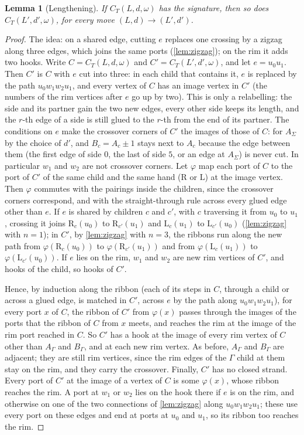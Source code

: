 \documentclass[11pt]{amsart}
\newtheorem{lemma}[theorem]{Lemma}
\theoremstyle{definition}
\theoremstyle{remark}
\newcommand{\Lp}{\mathrm L}
\newcommand{\Rp}{\mathrm R}
\begin{document}
\begin{lemma}[Lengthening]\label{lem:lengthen}
If $C_T(L,d,\omega)$ has the signature, then so does $C_T(L',d',\omega)$, for every move $(L,d)\to(L',d')$.
\end{lemma}

\begin{proof}
The idea: on a shared edge, cutting $e$ replaces one crossing by a zigzag along three edges, which joins the same
ports (\cref{lem:zigzag}); on the rim it adds two hooks. Write $C=C_T(L,d,\omega)$ and $C'=C_T(L',d',\omega)$, and
let $e=u_0u_1$. Then $C'$ is $C$ with $e$ cut into three: in each child that contains it, $e$ is replaced by the path
$u_0w_1w_2u_1$, and every vertex of $C$ has an image vertex in $C'$ (the numbers of the rim vertices after $e$ go up
by two). This is only a relabelling: the side and its partner gain the two new edges, every other side keeps its
length, and the $r$-th edge of a side is still glued to the $r$-th from the end of its partner. The conditions on $e$ make the crossover corners of $C'$ the images of those of $C$: for $A_\Sigma$ by the
choice of $d'$, and $B_c=A_c\pm1$ stays next to $A_c$ because the edge between them (the first edge of side $0$, the
last of side $5$, or an edge at $A_\Sigma$) is never cut. In particular $w_1$ and $w_2$ are not crossover corners. Let
$\varphi$ map each port of $C$ to the port of $C'$ of the same child and the same hand ($\Rp$ or $\Lp$) at the image
vertex. Then $\varphi$ commutes with the pairings inside the children, since the crossover corners correspond, and with
the straight-through rule across every glued edge other than $e$. If $e$ is shared by children $c$ and $c'$, with $c$
traversing it from $u_0$ to $u_1$, crossing it joins $\Rp_c(u_0)$ to $\Rp_{c'}(u_1)$ and $\Lp_c(u_1)$ to
$\Lp_{c'}(u_0)$ (\cref{lem:zigzag} with $n=1$); in $C'$, by \cref{lem:zigzag} with $n=3$, the ribbons run along the
new path from $\varphi(\Rp_c(u_0))$ to $\varphi(\Rp_{c'}(u_1))$ and from $\varphi(\Lp_c(u_1))$ to
$\varphi(\Lp_{c'}(u_0))$. If $e$ lies on the rim, $w_1$ and $w_2$ are new rim vertices of $C'$, and hooks of the child,
so hooks of $C'$.

Hence, by induction along the ribbon (each of its steps in $C$, through a child or across a glued edge, is matched in
$C'$, across $e$ by the path along $u_0w_1w_2u_1$), for every port $x$ of $C$, the ribbon of $C'$ from $\varphi(x)$
passes through the images of the ports that the ribbon of $C$ from $x$ meets, and reaches the rim at the image of the rim port reached in $C$. So $C'$ has a hook at
the image of every rim vertex of $C$ other than $A_\Gamma$ and $B_\Gamma$, and at each new rim vertex. As before,
$A_\Gamma$ and $B_\Gamma$ are adjacent; they are still rim vertices, since the rim edges of the $\Gamma$ child at them
stay on the rim, and they carry the crossover. Finally, $C'$ has no closed strand. Every port of $C'$ at the image of
a vertex of $C$ is some $\varphi(x)$, whose ribbon reaches the rim. A port at $w_1$ or $w_2$ lies on the hook there if
$e$ is on the rim, and otherwise on one of the two connections of \cref{lem:zigzag} along $u_0w_1w_2u_1$; these use
every port on these edges and end at ports at $u_0$ and $u_1$, so its ribbon too reaches the rim.
\end{proof}
\end{document}
